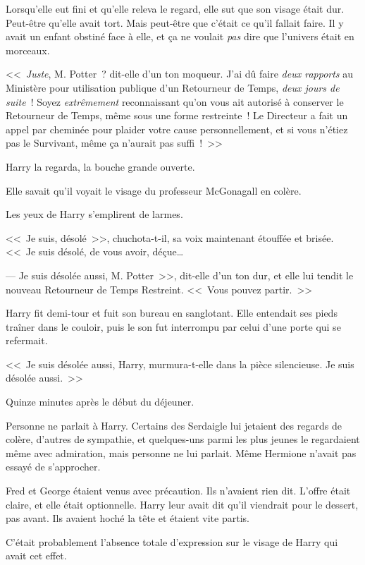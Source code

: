 Lorsqu'elle eut fini et qu'elle releva le regard, elle sut que son visage était dur. Peut-être qu'elle avait tort. Mais peut-être que c'était ce qu'il fallait faire. Il y avait un enfant obstiné face à elle, et ça ne voulait \emph{pas} dire que l'univers était en morceaux.

<<~\emph{Juste}, M. Potter~? dit-elle d'un ton moqueur. J'ai dû faire \emph{deux rapports} au Ministère pour utilisation publique d'un Retourneur de Temps, \emph{deux jours de suite}~! Soyez \emph{extrêmement} reconnaissant qu'on vous ait autorisé à conserver le Retourneur de Temps, même sous une forme restreinte~! Le Directeur a fait un appel par cheminée pour plaider votre cause personnellement, et si vous n'étiez pas le Survivant, même ça n'aurait pas suffi~!~>>

Harry la regarda, la bouche grande ouverte.

Elle savait qu'il voyait le visage du professeur McGonagall en colère.

Les yeux de Harry s'emplirent de larmes.

<<~Je suis, désolé~>>, chuchota-t-il, sa voix maintenant étouffée et brisée. <<~Je suis désolé, de vous avoir, déçue…

--- Je suis désolée aussi, M. Potter~>>, dit-elle d'un ton dur, et elle lui tendit le nouveau Retourneur de Temps Restreint. <<~Vous pouvez partir.~>>

Harry fit demi-tour et fuit son bureau en sanglotant. Elle entendait ses pieds traîner dans le couloir, puis le son fut interrompu par celui d'une porte qui se refermait.

<<~Je suis désolée aussi, Harry, murmura-t-elle dans la pièce silencieuse. Je suis désolée aussi.~>>

\later

Quinze minutes après le début du déjeuner.

Personne ne parlait à Harry. Certains des Serdaigle lui jetaient des regards de colère, d'autres de sympathie, et quelques-uns parmi les plus jeunes le regardaient même avec admiration, mais personne ne lui parlait. Même Hermione n'avait pas essayé de s'approcher.

Fred et George étaient venus avec précaution. Ils n'avaient rien dit. L'offre était claire, et elle était optionnelle. Harry leur avait dit qu'il viendrait pour le dessert, pas avant. Ils avaient hoché la tête et étaient vite partis.

C'était probablement l'absence totale d'expression sur le visage de Harry qui avait cet effet.

